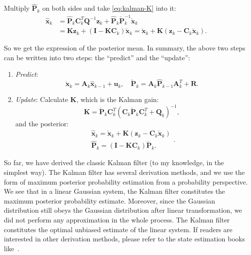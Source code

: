 Multiply $\mathbf{\hat{P}}_k$ on both sides and take \eqref{eq:kalman-K} into it:
\begin{align}
	{{\mathbf{\hat {x}}}_k} &= {{\hat {\mathbf{P}}}_k} \mathbf{C}_k^T { \mathbf{Q}^{ - 1}}{\mathbf{z}_k} + {{\mathbf{\hat{ P}}}_k}\check {\mathbf{P}}_k^{ - 1}{{\check {\mathbf{x}}}_k}\\
	&= \mathbf{K} {\mathbf{z}_k} + \left( {\mathbf{I} - \mathbf{K}{\mathbf{C}_k}} \right){{\mathbf{\check {x}}}_k} = {{\check {\mathbf{x}}}_k} + \mathbf{K} \left( {\mathbf{z}_k - {\mathbf{C}_k}{\mathbf{\check{x}}_k}} \right).
\end{align}

So we get the expression of the posterior mean. In summary, the above two steps can be written into two steps:  the ``predict'' and the ``update'':
\begin{mdframed}
	\begin{enumerate}
		\item \textit{Predict}:
		\begin{equation}
			\check{\mathbf{x}}_k = {\mathbf{A}_k {{\hat{\mathbf{x}}}_{k - 1}} + {\mathbf{u}_k}}, \quad \check{\mathbf{P}}_k = {\mathbf{A}_k \hat{\mathbf{P}}_{k-1} { \mathbf{A}^T_k} + \mathbf{R}}.
		\end{equation}
		\item \textit{Update}:
		Calculate $\mathbf{K}$, which is the Kalman gain:
		\begin{equation}
			\label{eq:kalman-K-another}
			\mathbf{K} = {{\check {\mathbf{P}}}_k} \mathbf{C}_k^T {\left( {{\mathbf{C}_k}{{\check {\mathbf{P}}}_k}\mathbf{C}_k^T + {\mathbf{Q}_k}} \right)^{ - 1}},
		\end{equation}
		and the posterior:
		\begin{equation}
			\begin{array}{l}
				\hat {\mathbf{x}}_k = {{\check {\mathbf{x}}}_k} + \mathbf{K} \left( {\mathbf{z}_k - {\mathbf{C}_k}{\mathbf{\check{x}}_k}} \right)\\
				{{\mathbf{\hat {P}}}_k} = \left( {\mathbf{I} - \mathbf{K}{\mathbf{C}_k}} \right) \check{\mathbf{P}}_k.
			\end{array}.
		\end{equation}
	\end{enumerate}
\end{mdframed}

So far, we have derived the classic Kalman filter (to my knowledge, in the simplest way). The Kalman filter has several derivation methods, and we use the form of maximum posterior probability estimation from a probability perspective. We see that in a linear Gaussian system, the Kalman filter constitutes the maximum posterior probability estimate. Moreover, since the Gaussian distribution still obeys the Gaussian distribution after linear transformation, we did not perform any approximation in the whole process. The Kalman filter constitutes the optimal unbiased estimate of the linear system. If readers are interested in other derivation methods, please refer to the state estimation books like~\cite{Barfoot2016}.

